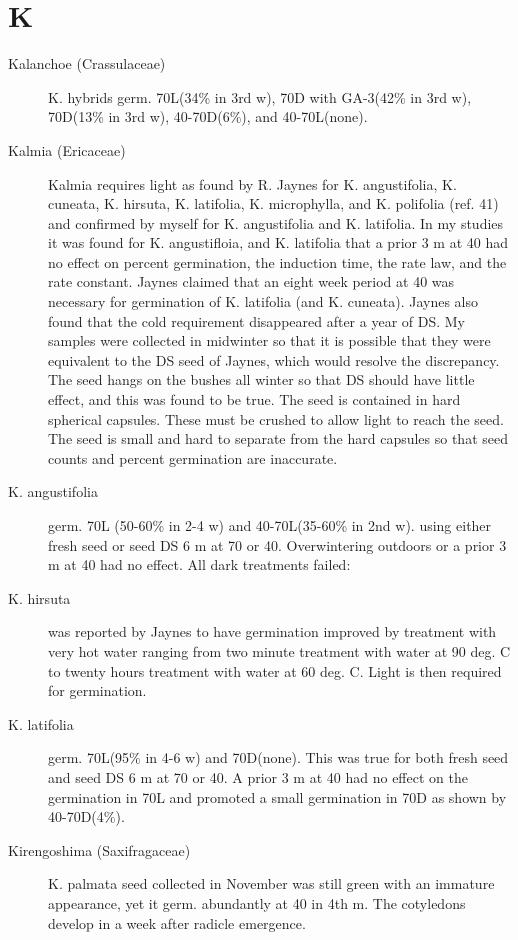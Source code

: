 \section{K}
\begin{description}

\item[Kalanchoe (Crassulaceae)] K. hybrids germ. 70L(34\% in 3rd w), 70D with
GA-3(42\% in 3rd w), 70D(13\% in 3rd w), 40-70D(6\%), and 40-70L(none).
\item[Kalmia (Ericaceae)] Kalmia requires light as found by R. Jaynes for K.
angustifolia, K. cuneata, K. hirsuta, K. latifolia, K. microphylla, and K. polifolia (ref. 41)
and confirmed by myself for K. angustifolia and K. latifolia. In my studies it was found
for K. angustifloia, and K. latifolia that a prior 3 m at 40 had no effect on percent
germination, the induction time, the rate law, and the rate constant. Jaynes claimed
that an eight week period at 40 was necessary for germination of K. latifolia (and K.
cuneata). Jaynes also found that the cold requirement disappeared after a year of DS.
My samples were collected in midwinter so that it is possible that they were equivalent
to the DS seed of Jaynes, which would resolve the discrepancy. The seed hangs on
the bushes all winter so that DS should have little effect, and this was found to be true.
The seed is contained in hard spherical capsules. These must be crushed to allow
light to reach the seed. The seed is small and hard to separate from the hard capsules
so that seed counts and percent germination are inaccurate.
\item[K. angustifolia] germ. 70L (50-60\% in 2-4 w) and 40-70L(35-60\% in 2nd w).
using either fresh seed or seed DS 6 m at 70 or 40. Overwintering outdoors or a prior
3 m at 40 had no effect. All dark treatments failed:
\item[K. hirsuta] was reported by Jaynes to have germination improved by treatment
with very hot water ranging from two minute treatment with water at 90 deg. C to twenty
hours treatment with water at 60 deg. C. Light is then required for germination.
\item[K. latifolia] germ. 70L(95\% in 4-6 w) and 70D(none). This was true for both fresh
seed and seed DS 6 m at 70 or 40. A prior 3 m at 40 had no effect on the germination
in 70L and promoted a small germination in 70D as shown by 40-70D(4\%).
\item[Kirengoshima (Saxifragaceae)] K. palmata seed collected in November
was still green with an immature appearance, yet it germ. abundantly at 40 in 4th m.
The cotyledons develop in a week after radicle emergence.


\end{description}
